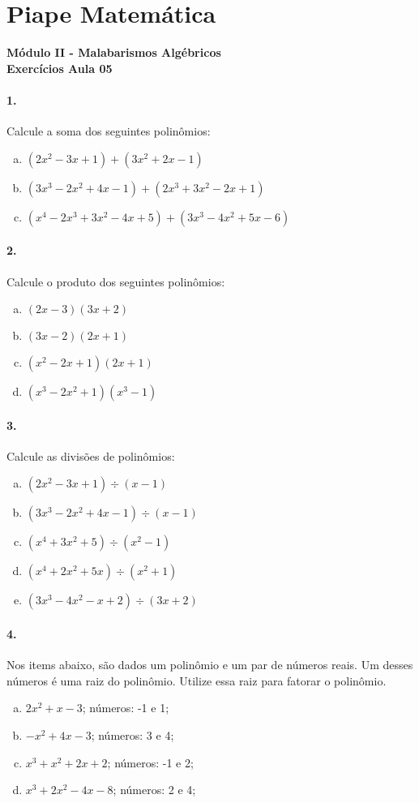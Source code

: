 \documentclass[a4paper,12pt]{article}
\begin{document}
 
  
\section*{Piape Matemática} 
\textbf{Módulo II - Malabarismos Algébricos}\\
\textbf{Exercícios Aula 05}         
\begin{multicols}{2}
\paragraph*{1.} Calcule a soma dos seguintes polinômios:
\begin{enumerate}[a)]
\item $(2x^2 - 3x + 1) + (3x^2 + 2x - 1)$
\item $(3x^3 - 2x^2 + 4x - 1) + (2x^3 + 3x^2 - 2x + 1)$
\item $(x^4 - 2x^3 + 3x^2 - 4x + 5) + ( 3x^3 - 4x^2 + 5x - 6)$ 
\end{enumerate}
\paragraph*{2.} Calcule o produto dos seguintes polinômios:
\begin{enumerate}[a)]
\item $(2x - 3)(3x + 2)$
\item $(3x - 2)(2x + 1)$
\item $(x^2 - 2x + 1)(2x + 1)$
\item $(x^3 - 2x^2 + 1)(x^3 - 1)$
\end{enumerate}

\paragraph*{3.} Calcule as divisões de polinômios:
\begin{enumerate}[a)]
\item $(2x^2 - 3x + 1) \div (x - 1)$
\item $(3x^3 - 2x^2 + 4x - 1) \div (x - 1)$
\item $(x^4  + 3x^2   + 5) \div (x^2 - 1)$
\item $(x^4  + 2x^2   + 5x) \div (x^2 + 1)$
\item $(3x^3-4x^2-x+2)\div(3x+2)$
\end{enumerate}

\paragraph*{4.} Nos items abaixo, são dados um polinômio e um par de números reais. Um desses números é uma raiz do polinômio. Utilize essa raiz para fatorar o polinômio.
\begin{enumerate}[a)]
\item $2x^2 + x - 3$; números: -1 e 1;
\item $-x^2 + 4x - 3$; números: 3 e 4; 
\item $x^3 + x^2 + 2x + 2$; números: -1 e 2;
\item $x^3 + 2x^2 -4x - 8$; números: 2 e 4;
\end{enumerate}


\end{multicols}
\end{document}
